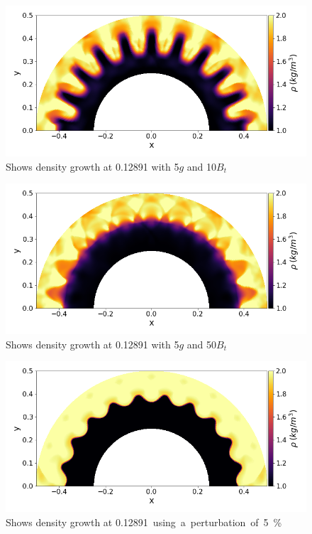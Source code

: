 \documentclass[paper=a4, fontsize=11pt]{scrartcl}
\numberwithin{equation}{section}                %
\numberwithin{figure}{section}                  %
\numberwithin{table}{section}                           %
\begin{document}
\begin{figure}[!htb]
  \centering
  \includegraphics[width=1.0\linewidth]{fig/560x480cpuBx}
  \caption{Shows density growth at \SI{0.12891}{} with 5$g$ and 10$B_t$}\label{fig:res:10bx}
\end{figure}
\begin{figure}[!htb]
  \centering
  \includegraphics[width=1.0\linewidth]{fig/560x480cpuBx5}
  \caption{Shows density growth at \SI{0.12891}{} with 5$g$ and 50$B_t$}\label{fig:res:50bx}
\end{figure}

\begin{figure}[!htb]
  \centering
  \includegraphics[width=1.0\linewidth]{fig/560x480gpu}
  \caption{Shows density growth at \SI{0.12891} using a perturbation of 5\%}\label{fig:res:gpu}
\end{figure}
\end{document}
